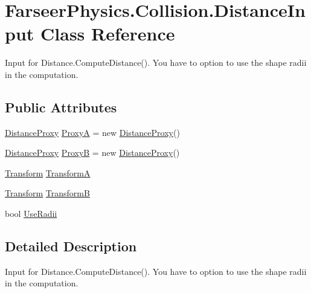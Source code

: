 \hypertarget{class_farseer_physics_1_1_collision_1_1_distance_input}{\section{Farseer\+Physics.\+Collision.\+Distance\+Input Class Reference}
\label{class_farseer_physics_1_1_collision_1_1_distance_input}
}


Input for Distance.\+Compute\+Distance(). You have to option to use the shape radii in the computation.  


\subsection*{Public Attributes}
\begin{DoxyCompactItemize}
\item 
\hyperlink{class_farseer_physics_1_1_collision_1_1_distance_proxy}{Distance\+Proxy} \hyperlink{class_farseer_physics_1_1_collision_1_1_distance_input_a9d8647624d9255f1e85b4fc05c518f30}{Proxy\+A} = new \hyperlink{class_farseer_physics_1_1_collision_1_1_distance_proxy}{Distance\+Proxy}()
\item 
\hyperlink{class_farseer_physics_1_1_collision_1_1_distance_proxy}{Distance\+Proxy} \hyperlink{class_farseer_physics_1_1_collision_1_1_distance_input_a67d73b21152b3390dd7061483f847cb1}{Proxy\+B} = new \hyperlink{class_farseer_physics_1_1_collision_1_1_distance_proxy}{Distance\+Proxy}()
\item 
\hyperlink{struct_farseer_physics_1_1_common_1_1_transform}{Transform} \hyperlink{class_farseer_physics_1_1_collision_1_1_distance_input_a4dc18b9cc0e07dd79d5cebea9b4fc7d5}{Transform\+A}
\item 
\hyperlink{struct_farseer_physics_1_1_common_1_1_transform}{Transform} \hyperlink{class_farseer_physics_1_1_collision_1_1_distance_input_a793150de20dadb5168792f7b435ecb4d}{Transform\+B}
\item 
bool \hyperlink{class_farseer_physics_1_1_collision_1_1_distance_input_afc0f3f7474ad8ff8cc471cae45348dfa}{Use\+Radii}
\end{DoxyCompactItemize}


\subsection{Detailed Description}
Input for Distance.\+Compute\+Distance(). You have to option to use the shape radii in the computation. 



